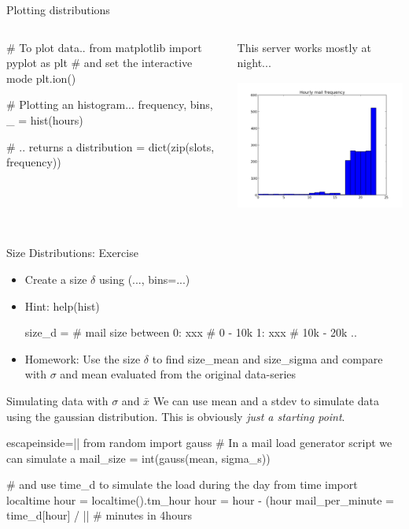\begin{pyframe}{Plotting distributions}
\begin{columns}
\begin{pycode}
# To plot data..
from matplotlib import pyplot as plt
# and set the interactive mode
plt.ion()

# Plotting an histogram... 
frequency, bins, _ = hist(hours)

# .. returns a 
distribution = dict(zip(slots, 
    frequency))
\end{pycode}
This server works mostly at night...
\includegraphics[width=6cm,height=5cm]{hourly_mail_d.pdf}
\end{columns}
\end{pyframe}

\begin{pyframe}{Size Distributions: Exercise}
\begin{itemize}
\item Create a size $\delta$ using (..., bins=...)
\item Hint: help(hist)
\begin{pycode}
size_d = {  # mail size between
    0: xxx  #  0 - 10k
    1: xxx  #  10k - 20k
    ..
    }
\end{pycode}
\item Homework: Use the size $\delta$ to find size\_mean and size\_sigma and compare with $\sigma$ and mean evaluated from the original data-series
\end{itemize}
\end{pyframe}



\begin{pyframe}{Simulating data with $\sigma$ and $\bar{x}$}
We can use  mean and a stdev to simulate data using the gaussian distribution.
This is obviously \emph{just a starting point}.
\begin{pycode*}{escapeinside=||}
from random import gauss
# In a mail load generator script we can simulate a
mail_size = int(gauss(mean, sigma_s))

# and use time_d to simulate the load during the day
from time import localtime
hour = localtime().tm_hour
hour = hour - (hour %
mail_per_minute = time_d[hour] / || # minutes in 4hours
\end{pycode*}
\end{pyframe}



